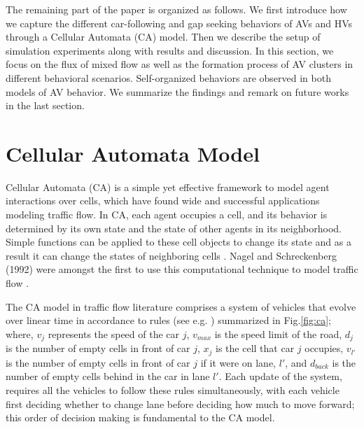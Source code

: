 \documentclass[oneside,letter,11pt]{article}
\begin{document}


The remaining part of the paper is organized as follows. We first introduce how we capture the different car-following and gap seeking behaviors of AVs and HVs through a Cellular Automata (CA) model. Then we describe the setup of simulation experiments along with results and discussion. In this section, we focus on the flux of mixed flow as well as the formation process of AV clusters in different behavioral scenarios. Self-organized behaviors are observed in both models of AV behavior. We summarize the findings and remark on future works in the last section.



\section{Cellular Automata Model}\label{S:2}

Cellular Automata (CA) is a simple yet effective framework to model agent interactions over cells, which have found wide and successful applications modeling traffic flow. In CA, each agent occupies a cell, and its behavior is determined by its own state and the state of other agents in its neighborhood. Simple functions can be applied to these cell objects to change its state and as a result it can change the states of neighboring cells \cite{CAb}. Nagel and Schreckenberg (1992)  were amongst the first to use this computational technique to model traffic flow \cite{CA}. 

The CA model in traffic flow literature comprises a system of vehicles that evolve over linear time in accordance to rules (see e.g. \cite{CA2}\cite{NaSch}) summarized in Fig.\ref{fig:ca}; where, $v_{j}$ represents the speed of the car $j$, $v_{max}$ is the speed limit of the road, $d_{j}$ is the number of empty cells in front of car $j$, $x_{j}$ is the cell that car $j$ occupies, $v_{l'}$ is the number of empty cells in front of car $j$ if it were on lane, $l'$, and $d_{back}$ is the number of empty cells behind in the car in lane $l'$. Each update of the system, requires all the vehicles to follow these rules simultaneously, with each vehicle first deciding whether to change lane before deciding how much to move forward; this order of decision making is fundamental to the CA model.
\end{document}
